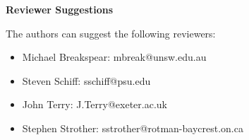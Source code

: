 \documentclass[]{article}
\begin{document}
	
\textbf{Reviewer Suggestions}

The authors can suggest the following reviewers:
\begin{itemize}
	\item Michael Breakspear: mbreak@unsw.edu.au
	\item Steven Schiff: sschiff@psu.edu
	\item John Terry: J.Terry@exeter.ac.uk
	\item Stephen Strother: sstrother@rotman-baycrest.on.ca
\end{itemize}
\end{document}
